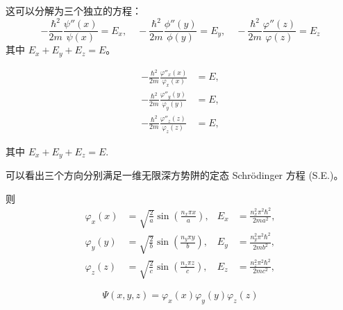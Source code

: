 \documentclass[lang=cn,15pt]{elegantbook}
\begin{document}
这可以分解为三个独立的方程：
\[
-\frac{\hbar^2}{2m} \frac{\psi''(x)}{\psi(x)} = E_x, \quad -\frac{\hbar^2}{2m} \frac{\phi''(y)}{\phi(y)} = E_y, \quad -\frac{\hbar^2}{2m} \frac{\varphi''(z)}{\varphi(z)} = E_z
\]
其中 $E_x + E_y + E_z = E$。


\begin{align*}
	-\frac{\hbar^2}{2m} \frac{\varphi''_x(x)}{\varphi_x(x)} &= E, \\
	-\frac{\hbar^2}{2m} \frac{\varphi''_y(y)}{\varphi_y(y)} &= E, \\
	-\frac{\hbar^2}{2m} \frac{\varphi''_z(z)}{\varphi_z(z)} &= E,
\end{align*}

其中 $E_x + E_y + E_z = E$.

可以看出三个方向分别满足一维无限深方势阱的定态 Schrödinger 方程 (S.E.)。

则
\begin{align*}
	\varphi_x(x) &= \sqrt{\frac{2}{a}} \sin\left(\frac{n_x \pi x}{a}\right), & E_x &= \frac{n_x^2 \pi^2 \hbar^2}{2ma^2}, \\
	\varphi_y(y) &= \sqrt{\frac{2}{b}} \sin\left(\frac{n_y \pi y}{b}\right), & E_y &= \frac{n_y^2 \pi^2 \hbar^2}{2mb^2}, \\
	\varphi_z(z) &= \sqrt{\frac{2}{c}} \sin\left(\frac{n_z \pi z}{c}\right), & E_z &= \frac{n_z^2 \pi^2 \hbar^2}{2mc^2},
\end{align*}

\[
\Psi(x, y, z) = \varphi_x(x) \varphi_y(y) \varphi_z(z)
\]
\end{document}
